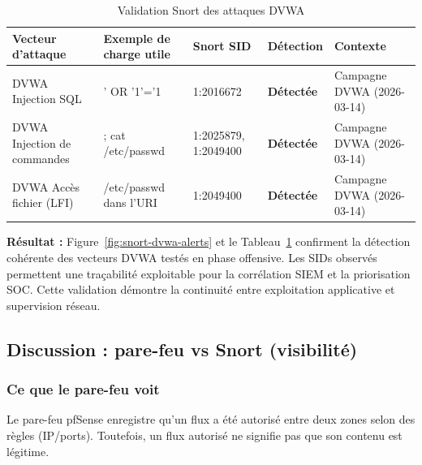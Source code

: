 \documentclass[12pt,a4paper,openany]{report}
\newcommand{\tableheadcolor}{\rowcolor{tableheadbg}}
\begin{document}
	\begin{table}[H]
		\centering
		\small
		\renewcommand{\arraystretch}{1.3}
		\setlength{\arrayrulewidth}{0.5pt}
		\begin{tabular}{p{3.2cm} p{2.8cm} p{2.4cm} >{\centering\arraybackslash}p{1.9cm} p{2.8cm}}
			\arrayrulecolor{tableborder}
			\hline
			\tableheadcolor
			\textcolor{tableheadfg}{\textbf{Vecteur d'attaque}} &
			\textcolor{tableheadfg}{\textbf{Exemple de charge utile}} &
			\textcolor{tableheadfg}{\textbf{Snort SID}} &
			\textcolor{tableheadfg}{\textbf{Détection}} &
			\textcolor{tableheadfg}{\textbf{Contexte}} \\
			\hline
			\rowcolor{tablerowalt}
			DVWA Injection SQL & ' OR '1'='1 & 1:2016672 & \textcolor{green!50!black}{\textbf{Détectée}} & Campagne DVWA (2026-03-14) \\
			DVWA Injection de commandes & ; cat /etc/passwd & 1:2025879, 1:2049400 & \textcolor{green!50!black}{\textbf{Détectée}} & Campagne DVWA (2026-03-14) \\
			\rowcolor{tablerowalt}
			DVWA Accès fichier (LFI) & /etc/passwd dans l'URI & 1:2049400 & \textcolor{green!50!black}{\textbf{Détectée}} & Campagne DVWA (2026-03-14) \\
			\hline
		\end{tabular}
		\caption{Validation Snort des attaques DVWA}
		\label{tab:snort-dvwa-validation}
	\end{table}
	
	\textbf{Résultat :} Figure~\ref{fig:snort-dvwa-alerts} et le Tableau~\ref{tab:snort-dvwa-validation} confirment la détection cohérente des vecteurs DVWA testés en phase offensive. Les SIDs observés permettent une traçabilité exploitable pour la corrélation SIEM et la priorisation SOC. Cette validation démontre la continuité entre exploitation applicative et supervision réseau.
	
	\subsection{Discussion : pare-feu vs Snort (visibilité)}
	
	\subsubsection{Ce que le pare-feu voit}
	Le pare-feu pfSense enregistre qu'un flux a été autorisé entre deux zones selon des règles (IP/ports). Toutefois, un flux autorisé ne signifie pas que son contenu est légitime.
	
\end{document}
